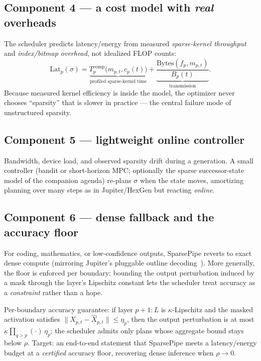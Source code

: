 \documentclass[11pt]{article}
\begin{document}
\subsection{Component 4 --- a cost model with \emph{real} overheads}
The scheduler predicts latency/energy from measured \emph{sparse-kernel throughput} and
\emph{index/bitmap overhead}, not idealized FLOP counts:
\[
\text{Lat}_p(\sigma) = \underbrace{T^{\text{comp}}_p\big(m_{p,t},c_p(t)\big)}_{\text{profiled sparse-kernel time}}
+\underbrace{\frac{\text{Bytes}(f_p,m_{p,t})}{B_p(t)}}_{\text{transmission}} .
\]
Because measured kernel efficiency is inside the model, the optimizer never chooses
``sparsity'' that is slower in practice --- the central failure mode of unstructured
sparsity.

\subsection{Component 5 --- lightweight online controller}
Bandwidth, device load, and observed sparsity drift during a generation. A small controller
(bandit or short-horizon MPC; optionally the sparse successor-state model of the companion
agenda) re-plans $\sigma$ when the state moves, amortizing planning over many steps as in
Jupiter/HexGen but reacting \emph{online}.

\subsection{Component 6 --- dense fallback and the accuracy floor}
For coding, mathematics, or low-confidence outputs, SparsePipe reverts to exact dense compute
(mirroring Jupiter's pluggable outline decoding~\cite{jupiter}). More generally, the floor is
enforced per boundary: bounding the output perturbation induced by a mask through the layer's
Lipschitz constant lets the scheduler treat accuracy as a \emph{constraint} rather than a
hope.

\begin{theorybox}
Per-boundary accuracy guarantee: if layer $p{+}1{:}L$ is $\kappa$-Lipschitz and the masked
activation satisfies $\|X_{p,t}-\hat X_{p,t}\|\le \eta_p$, then the output perturbation is at
most $\kappa\prod_{q>p}(\cdot)\,\eta_p$; the scheduler admits only plans whose aggregate bound
stays below $\rho$. Target: an end-to-end statement that SparsePipe meets a latency/energy
budget at a \emph{certified} accuracy floor, recovering dense inference when $\rho\to 0$.
\end{theorybox}
\end{document}

